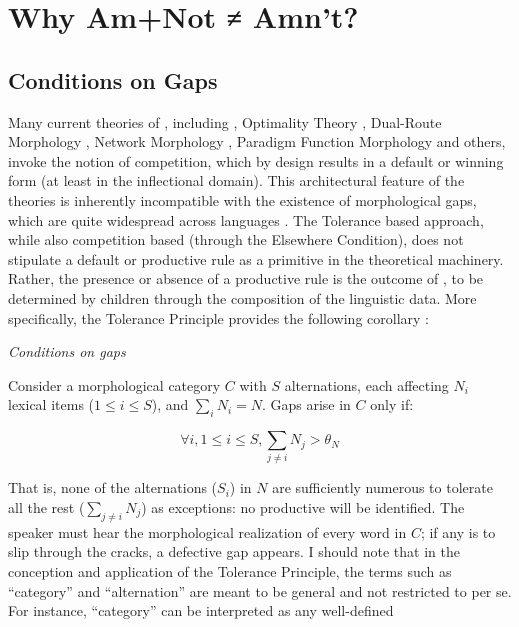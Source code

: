 \documentclass[output=paper,
modfonts
]{LSP/langsci}
\begin{document}
\section{Why Am+Not ≠ Amn't?}
\subsection{Conditions on Gaps}
Many current theories of , including 
\citep[for which see][]{Halle1993}, Optimality Theory \citep{OT}, Dual-Route Morphology
\citep{Pinker1999, Clahsen1999}, Network Morphology \citep{Brown2012},
Paradigm Function Morphology \citep{Stump2001b} and others, invoke the
notion of competition, which by design results in a default or winning
form (at least in the inflectional domain). This architectural feature
of the theories is
inherently incompatible with the  existence of morphological gaps,
which are  quite widespread across languages \citep{Baerman2010a}. 
The Tolerance based approach, while also 
competition based  (through the Elsewhere
Condition), does not stipulate a default or productive rule as a 
primitive in the theoretical machinery. Rather,  the presence or absence
of a productive rule is the outcome of 
, to be determined by children
through the composition of the linguistic data. 
 More specifically, the Tolerance
Principle provides the following corollary \citep[142]{POP}:  
\begin{exe} \ex \label{gaptheorem} \textit{Conditions on gaps}

Consider a morphological category $C$ with $S$ alternations, each
affecting $N_i$ lexical items ($1\leq i \leq S$),  and $\sum_i N_i =
N$. Gaps arise in $C$ only if: 

 \[\forall i, 1\leq i\leq S, \sum_{j\neq i} N_j > \theta_N \]
\end{exe}  
\noindent That is, none of the alternations ($S_i$) in $N$ are
sufficiently numerous to tolerate all the rest ($\sum_{j\neq i} N_j$) as
exceptions:  no productive   will be identified. The
speaker must hear the morphological realization of every word in $C$;
if any is to slip through the cracks, a defective gap appears.  I
should note that in the conception and application of the Tolerance
Principle, the terms such as 
``category'' and ``alternation'' are meant to be
general and not restricted to  per se. For instance,
``category'' can be interpreted as any well-defined 
\end{document}
